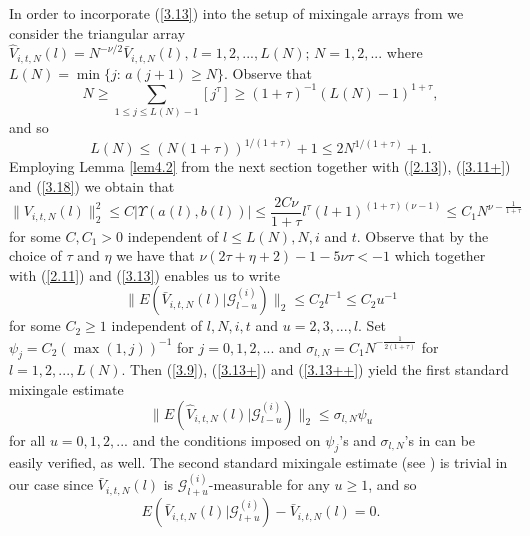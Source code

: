 In order to incorporate (\ref{3.13}) into the setup of mixingale arrays from
\cite{ML2} we consider the triangular array $\hat V_{i,t,N}(l)=N^{-\nu/2}
\bar V_{i,t,N}(l),\, l=1,2,...,L(N);\, N=1,2,...$ where $L(N)=\min\{ j:\,
a(j+1)\geq N\}$. Observe that
\[
N\geq\sum_{1\leq j\leq L(N)-1}[j^\tau]\geq(1+\tau)^{-1}(L(N)-1)^{1+\tau},
\]
and so
\begin{equation}\label{3.18}
L(N)\leq (N(1+\tau))^{1/(1+\tau)}+1\leq 2N^{1/(1+\tau)}+1.
\end{equation}
Employing Lemma \ref{lem4.2} from the next section together with (\ref{2.13}),
(\ref{3.11+}) and (\ref{3.18}) we obtain that
\begin{equation}\label{3.13+}
\|V_{i,t,N}(l)\|^2_2\leq C|{{\Upsilon}}(a(l),b(l))|\leq\frac {2C\nu}{1+\tau}l^\tau
(l+1)^{(1+\tau)(\nu-1)}\leq C_1N^{\nu-\frac 1{1+\tau}}
\end{equation}
for some $C,C_1>0$ independent of $l\leq L(N),N,i$ and $t$. Observe that by 
the choice of $\tau$ and $\eta$ we have that $\nu(2\tau+\eta+2)-1-5\nu\tau<-1$
 which together with (\ref{2.11}) and (\ref{3.13}) enables us
to write
\begin{equation}\label{3.13++}
\| E(\bar V_{i,t,N}(l)|{{\mathcal G}}^{(i)}_{l-u})\|_2\leq C_2l^{-1}\leq C_2u^{-1}
\end{equation}
for some $C_2\geq 1$ independent of $l,N,i,t$ and $u=2,3,...,l$. Set
$\psi_j=C_2(\max(1,j))^{-1}$ for $j=0,1,2,...$ and ${{\sigma}}_{l,N}=C_1N^{-\frac
1{2(1+\tau)}}$ for $l=1,2,...,L(N)$. Then (\ref{3.9}), (\ref{3.13+})
and (\ref{3.13++}) yield the first standard mixingale estimate
\begin{equation}\label{3.13+++}
\| E(\hat V_{i,t,N}(l)|{{\mathcal G}}^{(i)}_{l-u})\|_2\leq{{\sigma}}_{l,N}\psi_u
\end{equation}
 for all $u=0,1,2,...$
and the conditions imposed on $\psi_j$'s and ${{\sigma}}_{l,N}$'s in \cite{ML2}
can be easily verified, as well. The second standard mixingale estimate 
(see \cite{ML2}) is trivial in our case since 
$\bar V_{i,t,N}(l)$ is ${{\mathcal G}}^{(i)}_{l+u}$-measurable for any $u\geq 1$, and
so
\begin{equation}\label{3.14}
E(\bar V_{i,t,N}(l)|{{\mathcal G}}^{(i)}_{l+u})-\bar V_{i,t,N}(l)=0.
\end{equation}

